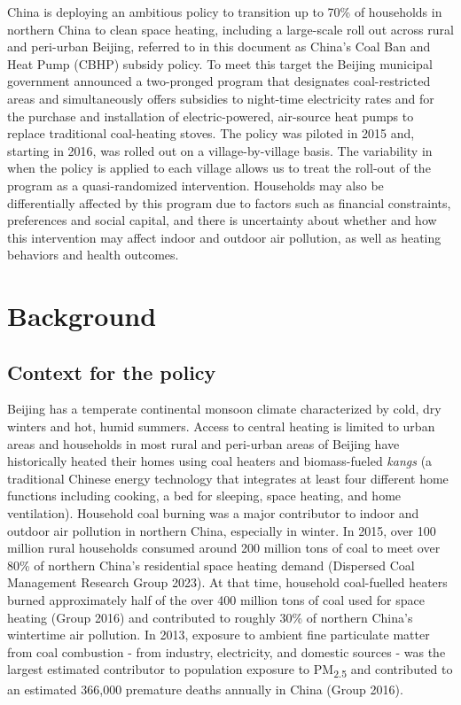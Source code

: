 \documentclass[
  letterpaper,
  DIV=11,
  numbers=noendperiod]{scrartcl}
\begin{document}
China is deploying an ambitious policy to transition up to 70\% of
households in northern China to clean space heating, including a
large-scale roll out across rural and peri-urban Beijing, referred to in
this document as China's Coal Ban and Heat Pump (CBHP) subsidy policy.
To meet this target the Beijing municipal government announced a
two-pronged program that designates coal-restricted areas and
simultaneously offers subsidies to night-time electricity rates and for
the purchase and installation of electric-powered, air-source heat pumps
to replace traditional coal-heating stoves. The policy was piloted in
2015 and, starting in 2016, was rolled out on a village-by-village
basis. The variability in when the policy is applied to each village
allows us to treat the roll-out of the program as a quasi-randomized
intervention. Households may also be differentially affected by this
program due to factors such as financial constraints, preferences and
social capital, and there is uncertainty about whether and how this
intervention may affect indoor and outdoor air pollution, as well as
heating behaviors and health outcomes.

\hypertarget{background}{%
\section{Background}\label{background}}

\hypertarget{context-for-the-policy}{%
\subsection{Context for the policy}\label{context-for-the-policy}}

Beijing has a temperate continental monsoon climate characterized by
cold, dry winters and hot, humid summers. Access to central heating is
limited to urban areas and households in most rural and peri-urban areas
of Beijing have historically heated their homes using coal heaters and
biomass-fueled \emph{kangs} (a traditional Chinese energy technology
that integrates at least four different home functions including
cooking, a bed for sleeping, space heating, and home ventilation).
Household coal burning was a major contributor to indoor and outdoor air
pollution in northern China, especially in winter. In 2015, over 100
million rural households consumed around 200 million tons of coal to
meet over 80\% of northern China's residential space heating demand
(Dispersed Coal Management Research Group 2023). At that time, household
coal-fuelled heaters burned approximately half of the over 400 million
tons of coal used for space heating (Group 2016) and contributed to
roughly 30\% of northern China's wintertime air pollution. In 2013,
exposure to ambient fine particulate matter from coal combustion - from
industry, electricity, and domestic sources - was the largest estimated
contributor to population exposure to PM\textsubscript{2.5} and
contributed to an estimated 366,000 premature deaths annually in China
(Group 2016).
\end{document}
